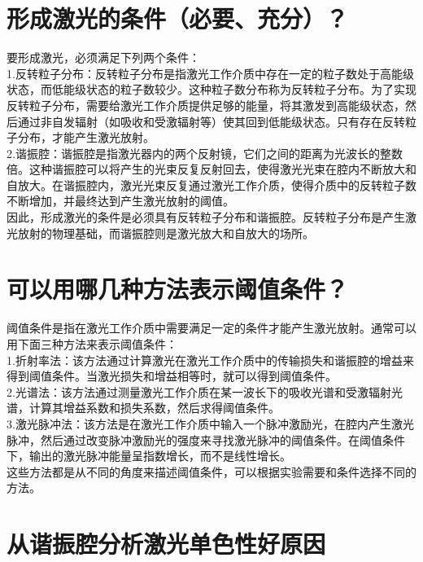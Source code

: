 \documentclass[12pt, a4paper, oneside]{article}
\begin{document}
\begin{spacing}{2.0}
\section{形成激光的条件（必要、充分）？ }
要形成激光，必须满足下列两个条件：
\\
1.反转粒子分布：反转粒子分布是指激光工作介质中存在一定的粒子数处于高能级状态，而低能级状态的粒子数较少。这种粒子数分布称为反转粒子分布。为了实现反转粒子分布，需要给激光工作介质提供足够的能量，将其激发到高能级状态，然后通过非自发辐射（如吸收和受激辐射等）使其回到低能级状态。只有存在反转粒子分布，才能产生激光放射。
\\
2.谐振腔：谐振腔是指激光器内的两个反射镜，它们之间的距离为光波长的整数倍。这种谐振腔可以将产生的光束反复反射回去，使得激光光束在腔内不断放大和自放大。在谐振腔内，激光光束反复通过激光工作介质，使得介质中的反转粒子数不断增加，并最终达到产生激光放射的阈值。
\\
因此，形成激光的条件是必须具有反转粒子分布和谐振腔。反转粒子分布是产生激光放射的物理基础，而谐振腔则是激光放大和自放大的场所。

\section{可以用哪几种方法表示阈值条件？ }
阈值条件是指在激光工作介质中需要满足一定的条件才能产生激光放射。通常可以用下面三种方法来表示阈值条件：
\\
1.折射率法：该方法通过计算激光在激光工作介质中的传输损失和谐振腔的增益来得到阈值条件。当激光损失和增益相等时，就可以得到阈值条件。
\\
2.光谱法：该方法通过测量激光工作介质在某一波长下的吸收光谱和受激辐射光谱，计算其增益系数和损失系数，然后求得阈值条件。
\\
3.激光脉冲法：该方法是在激光工作介质中输入一个脉冲激励光，在腔内产生激光脉冲，然后通过改变脉冲激励光的强度来寻找激光脉冲的阈值条件。在阈值条件下，输出的激光脉冲能量呈指数增长，而不是线性增长。
\\
这些方法都是从不同的角度来描述阈值条件，可以根据实验需要和条件选择不同的方法。


\section{从谐振腔分析激光单色性好原因}


\end{spacing}
\end{document}
